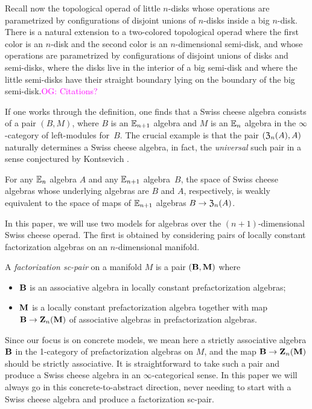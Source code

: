 \documentclass[11pt]{amsart}
\numberwithin{equation}{section}
\def\owen{\textcolor{magenta}{OG: }\textcolor{magenta}}
\begin{document}
Recall now the topological operad of little $n$-disks whose operations are parametrized by configurations of disjoint unions of $n$-disks inside a big $n$-disk.
There is a natural extension to a two-colored topological operad where the first color is an $n$-disk and the second color is an $n$-dimensional semi-disk, 
and whose operations are parametrized by configurations of disjoint unions of disks and semi-disks, where the disks live in the interior of a big semi-disk and where the little semi-disks have their straight boundary lying on the boundary of the big semi-disk.\owen{Citations?}

If one works through the definition, one finds that a Swiss cheese algebra consists of  a pair $(B, M)$, 
where $B$ is an $\mathbb E_{n+1}$ algebra and $M$ is an $\mathbb E_n$ algebra in the $\infty$-category of left-modules for~$B$.
The crucial example is that the pair $(\mathfrak Z_{n} (A), A)$ naturally determines a Swiss cheese algebra, 
in fact, the {\em universal} such pair in a sense conjectured by Kontsevich \cite{}.

\begin{thm} 
For any $\mathbb E_n$ algebra $A$ and any $\mathbb E_{n+1}$ algebra~$B$,
the space of Swiss cheese algebras whose underlying algebras are $B$ and $A$, respectively,
is weakly equivalent to the space of maps of $\mathbb E_{n+1}$ algebras $B \to \mathfrak Z_n(A)$. 
\end{thm}

In this paper, we will use two models for algebras over the $(n+1)$-dimensional Swiss cheese operad. 
The first is obtained by considering pairs of locally constant factorization algebras on an $n$-dimensional manifold. 

\begin{dfn}
\label{dfn:pair}
A {\em factorization sc-pair} on a manifold $M$ is a pair $(\mathbf B, \mathbf M)$ where
\begin{itemize}
\item $\mathbf B$ is an associative algebra in locally constant prefactorization algebras;
\item $\mathbf M$ is a locally constant prefactorization algebra together with map $\mathbf B \to \mathbf Z_n(\mathbf M)$ of associative algebras in prefactorization algebras.
\end{itemize}
\end{dfn}

\begin{rmk}
Since our focus is on concrete models, we mean here a strictly associative algebra $\mathbf B$ in the 1-category of prefactorization algebras on $M$,
and the map $\mathbf B \to \mathbf Z_n(\mathbf M)$ should be strictly associative.
It is straightforward to take such a pair and produce a Swiss cheese algebra in an $\infty$-categorical sense.
In this paper we will always go in this concrete-to-abstract direction,
never needing to start with a Swiss cheese algebra and produce a factorization sc-pair.
\end{rmk}
\end{document}
